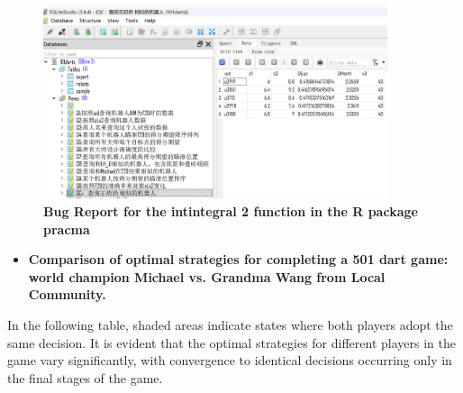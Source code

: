 \documentclass[cjjs]{ipart}
\theoremstyle{plain}
\begin{document}
\begin{figure}[H]
    \centering
    \includegraphics[width=0.90\textwidth]{13.png} 
    \caption{\textbf{Bug Report for the intintegral 2 function in the R package pracma}}
    \label{fig:13}
\end{figure}
\newpage
\begin{itemize}
    \item \textbf{Comparison of optimal strategies for completing a 501 dart game: world champion Michael vs. Grandma Wang from Local Community.}
\end{itemize}

\text In the following table, shaded areas indicate states where both players adopt the same decision. It is evident that the optimal strategies for different players in the game vary significantly, with convergence to identical decisions occurring only in the final stages of the game.   
\end{document}
